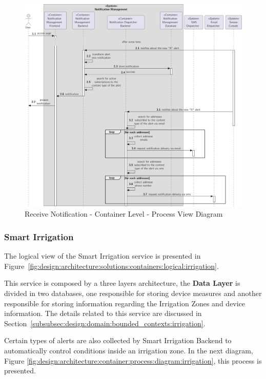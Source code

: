 \begin{figure}[H]
   \centering
   \includegraphics[page=1,width=\columnwidth]{assets/diagrams/design/architectural/level2/process/notification-dispatch.pdf}
   \caption[Receive Notification - Container Level - Process View Diagram]{Receive Notification - Container Level - Process View Diagram}
   \label{fig:design:architecture:container:process:diagram:notification}
\end{figure}

\subsubsection{Smart Irrigation}
\label{subsubsec:design:architecture:solutions:irrigation}

The logical view of the Smart Irrigation service is presented in Figure~\ref{fig:design:architecture:solutions:containers:logical:irrigation}.

This service is composed by a three layers architecture, the \textbf{Data Layer} is divided in two databases, one responsible for storing device measures and another responsible for storing information regarding the Irrigation Zones and device information. The details related to this service are discussed in Section~\ref{subsubsec:design:domain:bounded_contexts:irrigation}.

Certain types of alerts are also collected by Smart Irrigation Backend to automatically control conditions inside an irrigation zone. In the next diagram, Figure \ref{fig:design:architecture:container:process:diagram:irrigation}, this process is presented.

